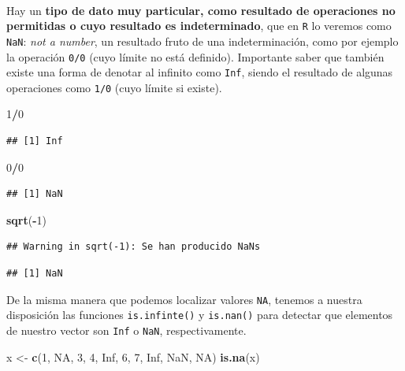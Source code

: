 \documentclass[11pt,]{book}
\newenvironment{Shaded}{\begin{snugshade}}{\end{snugshade}}
\newcommand{\DecValTok}[1]{\textcolor[rgb]{0.06,0.06,0.06}{#1}}
\newcommand{\KeywordTok}[1]{\textcolor[rgb]{0.27,0.27,0.27}{\textbf{#1}}}
\newcommand{\NormalTok}[1]{#1}
\newcommand{\OperatorTok}[1]{\textcolor[rgb]{0.43,0.43,0.43}{\textbf{#1}}}
\newcommand{\OtherTok}[1]{\textcolor[rgb]{0.37,0.37,0.37}{#1}}
\newcommand{\StringTok}[1]{\textcolor[rgb]{0.5,0.5,0.5}{#1}}
\begin{document}
~

Hay un \textbf{tipo de dato muy particular, como resultado de operaciones no permitidas o cuyo resultado es indeterminado}, que en \texttt{R} lo veremos como \texttt{NaN}: \emph{not a number}, un resultado fruto de una indeterminación, como por ejemplo la operación \texttt{0/0} (cuyo límite no está definido). Importante saber que también existe una forma de denotar al infinito como \texttt{Inf}, siendo el resultado de algunas operaciones como \texttt{1/0} (cuyo límite si existe).

\begin{Shaded}
\begin{Highlighting}[]
\DecValTok{1}\OperatorTok{/}\DecValTok{0}
\end{Highlighting}
\end{Shaded}

\begin{verbatim}
## [1] Inf
\end{verbatim}

\begin{Shaded}
\begin{Highlighting}[]
\DecValTok{0}\OperatorTok{/}\DecValTok{0}
\end{Highlighting}
\end{Shaded}

\begin{verbatim}
## [1] NaN
\end{verbatim}

\begin{Shaded}
\begin{Highlighting}[]
\KeywordTok{sqrt}\NormalTok{(}\OperatorTok{-}\DecValTok{1}\NormalTok{)}
\end{Highlighting}
\end{Shaded}

\begin{verbatim}
## Warning in sqrt(-1): Se han producido NaNs
\end{verbatim}

\begin{verbatim}
## [1] NaN
\end{verbatim}

De la misma manera que podemos localizar valores \texttt{NA}, tenemos a nuestra disposición las funciones \texttt{is.infinte()} y \texttt{is.nan()} para detectar que elementos de nuestro vector son \texttt{Inf} o \texttt{NaN}, respectivamente.

\begin{Shaded}
\begin{Highlighting}[]
\NormalTok{x <-}\StringTok{ }\KeywordTok{c}\NormalTok{(}\DecValTok{1}\NormalTok{, }\OtherTok{NA}\NormalTok{, }\DecValTok{3}\NormalTok{, }\DecValTok{4}\NormalTok{, }\OtherTok{Inf}\NormalTok{, }\DecValTok{6}\NormalTok{, }\DecValTok{7}\NormalTok{, }\OtherTok{Inf}\NormalTok{, }\OtherTok{NaN}\NormalTok{, }\OtherTok{NA}\NormalTok{)}
\KeywordTok{is.na}\NormalTok{(x)}
\end{Highlighting}
\end{Shaded}
\end{document}
